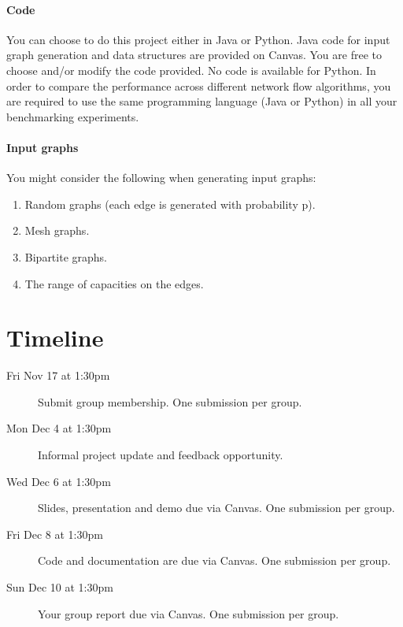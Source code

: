 \documentclass[11pt]{article}
\begin{document}
\paragraph{Code} You can choose to do this project either in Java or Python. Java code for input graph generation and data structures are provided on Canvas. You are free to choose and/or modify the code provided. No code is available for Python. In order to compare the performance across different network flow algorithms, you are required to use the same programming language (Java or Python) in all your benchmarking experiments.

\paragraph{Input graphs} You might consider the following when generating input graphs:
\begin{enumerate}
\item Random graphs (each edge is generated with probability p).
\item Mesh graphs.
\item Bipartite graphs.
\item The range of capacities on the edges.
\end{enumerate}

\section{Timeline}
\begin{description}  
\item[Fri Nov 17 at 1:30pm] Submit group membership. One submission per group.
\item[Mon Dec 4 at 1:30pm] Informal project update and feedback opportunity.
\item[Wed Dec 6 at 1:30pm] Slides, presentation and demo due via Canvas. One submission per group.
\item[Fri Dec 8 at 1:30pm] Code and documentation are due via Canvas. One submission per group.
\item[Sun Dec 10 at 1:30pm] Your group report due via Canvas. One submission per group.
\end{description}
\end{document}
